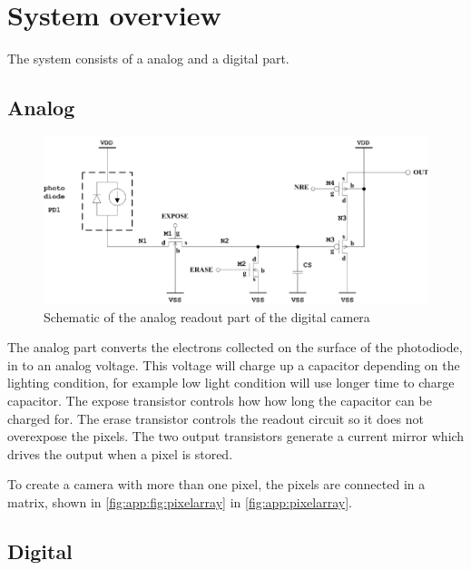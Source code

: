 \newpage
\section{System overview}
The system consists of a analog and a digital part. 

\subsection{Analog}

\begin{figure}[!htbp]
    \centering
    \includegraphics[width=\textwidth]{Images/Circuits/analog_circuit.pdf}
    \caption{Schematic of the analog readout part of the digital camera}
    \label{fig:system:an:sch}
\end{figure}

The analog part converts the electrons collected on the surface of the photodiode, in to an analog voltage. 
This voltage will charge up a capacitor depending on the lighting condition, for example low light condition will use longer time to charge capacitor. 
The expose transistor controls how  how long the capacitor can be charged for. 
The erase transistor controls the readout circuit so it does not overexpose the pixels. 
The two output transistors generate a current mirror which drives the output when a pixel is stored. 

To create a camera with more than one pixel, the pixels are connected in a matrix, shown in \cref{fig:app:fig:pixelarray} in \cref{fig:app:pixelarray}.

\subsection{Digital}

